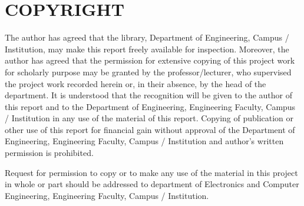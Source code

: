 \chapter*{COPYRIGHT}
{}

The author has agreed that the library, Department of Engineering, Campus / Institution, may make this report freely available for inspection. Moreover, the author has agreed that the permission for extensive copying of this project work for scholarly purpose may be granted by the professor/lecturer, who supervised the project work recorded herein or, in their absence, by the head of the department. It is understood that the recognition will be given to the author of this report and to the Department of Engineering, Engineering Faculty, Campus / Institution in any use of the material of this report. Copying of publication or other use of this report for financial gain without approval of the Department of Engineering, Engineering Faculty, Campus / Institution and author's written permission is prohibited. 

Request for permission to copy or to make any use of the material in this project in whole or part should be addressed to department of Electronics and Computer
Engineering, Engineering Faculty, Campus / Institution.
